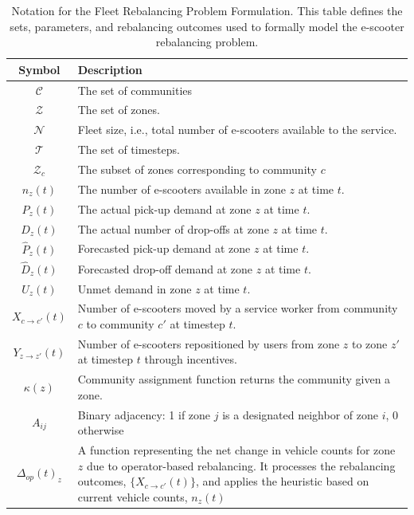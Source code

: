 \begin{table}[!htb]
    \centering
    \begin{tabularx}{\textwidth}{cX}
        \toprule
        Symbol &  Description \\
        \midrule
        $\mathcal{C}$   & The set of communities \\
        $\mathcal{Z}$   & The set of zones. \\
        $\mathcal{N}$   & Fleet size, i.e., total number of e-scooters available to the service. \\
        $\mathcal{T}$   & The set of timesteps. \\
        $\mathcal{Z}_c$ & The subset of zones corresponding to community $c$ \\
        \midrule
        $n_z(t)$        & The number of e-scooters available in zone $z$ at time $t$. \\
        $P_z(t)$        & The actual pick-up demand at zone $z$ at time $t$. \\
        $D_z(t)$        & The actual number of drop-offs at zone $z$ at time $t$. \\
        $\hat P_z(t)$   & Forecasted pick-up demand at zone $z$ at time $t$. \\
        $\hat D_z(t)$   & Forecasted drop-off demand at zone $z$ at time $t$. \\
        $U_z(t)$        & Unmet demand in zone $z$ at time $t$.\\
        \midrule
        $X_{c\rightarrow c'}(t)$ 
            & Number of e-scooters moved by a service worker from community $c$ to community $c'$ at timestep $t$. \\
        $Y_{z\rightarrow z'}(t)$ 
            & Number of e-scooters repositioned by users from zone $z$ to zone $z'$ at timestep $t$ through incentives. \\
        \midrule
        $\kappa(z)$     & Community assignment function returns the community given a zone.\\
        $A_{ij}$
            & Binary adjacency: 1 if zone $j$ is a designated neighbor of zone $i$, 0 otherwise\\
        $\Delta_{op}(t)_z$ & A function representing the net change in vehicle counts for zone $z$ due to operator-based rebalancing. It processes the rebalancing outcomes, $\{X_{c\rightarrow c'}(t)\}$, and applies the heuristic based on current vehicle counts, $n_z(t)$ \\
        \bottomrule
    \end{tabularx}
    \caption{Notation for the Fleet Rebalancing Problem Formulation. This table defines the sets, parameters, and rebalancing outcomes used to formally model the e-scooter rebalancing problem.}
    \label{tab:problem_notation}
\end{table}

